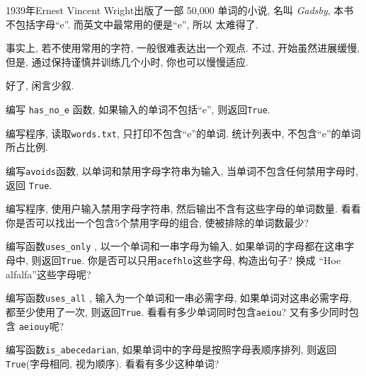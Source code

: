 \documentclass[10pt]{book}
\begin{document}
\begin{exercise}

1939年Ernest Vincent Wright出版了一部 50,000 单词的小说, 名叫
{\em Gadsby}, 本书不包括字母``e''. 而英文中最常用的便是``e'', 所以
太难得了. 

事实上, 若不使用常用的字符, 一般很难表达出一个观点. 
不过, 开始虽然进展缓慢, 但是, 通过保持谨慎并训练几个小时, 
你也可以慢慢适应. 

好了, 闲言少叙. 

编写 \verb"has_no_e" 函数, 如果输入的单词不包括``e'',  则返回{\tt True}. 

编写程序, 读取{\tt words.txt}, 只打印不包含``e''的单词. 
统计列表中, 不包含``e''的单词所占比例. 

\end{exercise}


\begin{exercise} 

编写{\tt avoids}函数, 以单词和禁用字母字符串为输入, 当单词不包含任何禁用字母时, 
返回 {\tt True}. 

编写程序, 使用户输入禁用字母字符串, 
然后输出不含有这些字母的单词数量. 
看看你是否可以找出一个包含5个禁用字母的组合, 
使被排除的单词数最少?

\end{exercise}


\begin{exercise}

编写函数\verb"uses_only" , 以一个单词和一串字母为输入, 
如果单词的字母都在这串字母中, 则返回{\tt True}.
你是否可以只用{\tt acefhlo}这些字母, 构造出句子?
换成 ``Hoe alfalfa''这些字母呢?

\end{exercise}


\begin{exercise} 

编写函数\verb"uses_all" , 输入为一个单词和一串必需字母, 
如果单词对这串必需字母, 都至少使用了一次, 则返回{\tt True}. 
看看有多少单词同时包含{\tt aeiou}? 又有多少同时包含 {\tt aeiouy}呢?

\end{exercise}


\begin{exercise}
编写函数\verb"is_abecedarian", 如果单词中的字母是按照字母表顺序排列, 
则返回 {\tt True}(字母相同, 视为顺序). 看看有多少这种单词?


\end{exercise}
\end{document}
